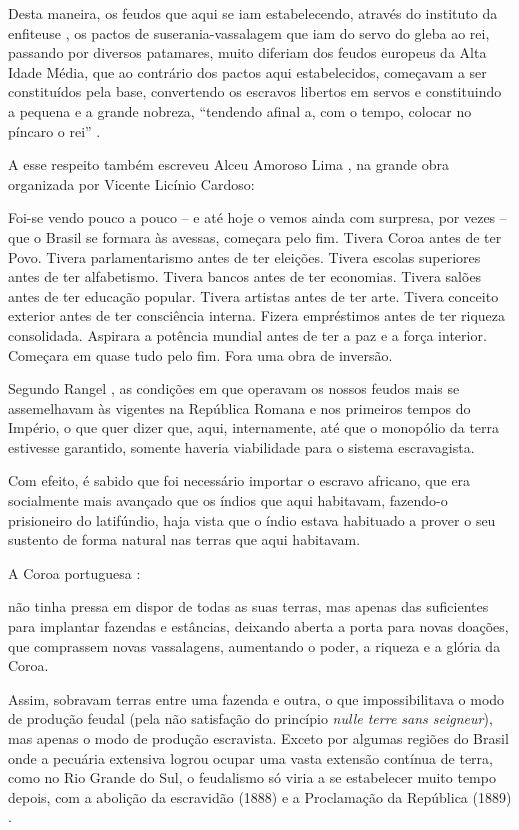 \documentclass[
	12pt,				%
	oneside,			%
	a4paper,			%
	chapter=TITLE,		%
	section=TITLE,		%
	english,			%
	brazil				%
	]{abntex2}
\begin{document}
Desta maneira, os feudos que aqui se iam estabelecendo, através do instituto da
enfiteuse \autocite[726]{rangel1989}, os pactos de suserania-vassalagem que iam do servo
do gleba ao rei, passando por diversos patamares, muito diferiam dos feudos
europeus da Alta Idade Média, que ao contrário dos pactos aqui estabelecidos,
começavam a ser constituídos pela base, convertendo os escravos libertos em
servos e constituindo a pequena e a grande nobreza, ``tendendo afinal a, com o
tempo, colocar no píncaro o rei'' \autocite[727]{rangel1989}.

A esse respeito também escreveu Alceu Amoroso Lima \autocite*[51]{amoroso}, na grande
obra organizada por Vicente Licínio Cardoso:
\begin{citacao}
Foi-se vendo pouco a pouco – e até hoje o vemos ainda com surpresa, por vezes –
que o Brasil se formara às avessas, começara pelo fim. Tivera Coroa antes de ter
Povo. Tivera parlamentarismo antes de ter eleições. Tivera escolas superiores
antes de ter alfabetismo. Tivera bancos antes de ter economias. Tivera salões
antes de ter educação popular. Tivera artistas antes de ter arte. Tivera
conceito exterior antes de ter consciência interna. Fizera empréstimos antes de
ter riqueza consolidada. Aspirara a potência mundial antes de ter a paz e a
força interior. Começara em quase tudo pelo fim. Fora uma obra de inversão.
\end{citacao}
Segundo Rangel \autocite*[729]{rangel1989}, as condições em que operavam os nossos
feudos mais se assemelhavam às vigentes na República Romana e nos primeiros
tempos do Império, o que quer dizer que, aqui, internamente, até que o monopólio
da terra estivesse garantido, somente haveria viabilidade para o sistema
escravagista.

Com efeito, é sabido que foi necessário importar o escravo africano, que era
socialmente mais avançado que os índios que aqui habitavam, fazendo-o
prisioneiro do latifúndio, haja vista que o índio estava habituado a prover o
seu sustento de forma natural nas terras que aqui habitavam.

A Coroa portuguesa \autocite[731]{rangel1989}:
\begin{citacao}
não tinha pressa em dispor de todas as suas terras, mas apenas das suficientes
para implantar fazendas e estâncias, deixando aberta a porta para novas doações,
que comprassem novas vassalagens, aumentando o poder, a riqueza e a glória da
Coroa.
\end{citacao}
Assim, sobravam terras entre uma fazenda e outra, o que impossibilitava o modo
de produção feudal (pela não satisfação do princípio \emph{nulle terre sans
seigneur}), mas apenas o modo de produção escravista. Exceto por algumas regiões
do Brasil onde a pecuária extensiva logrou ocupar uma vasta extensão contínua de
terra, como no Rio Grande do Sul, o feudalismo só viria a se estabelecer muito
tempo depois, com a abolição da escravidão (1888) e a Proclamação da República
(1889) \autocite[732-733]{rangel1989}.
\end{document}
